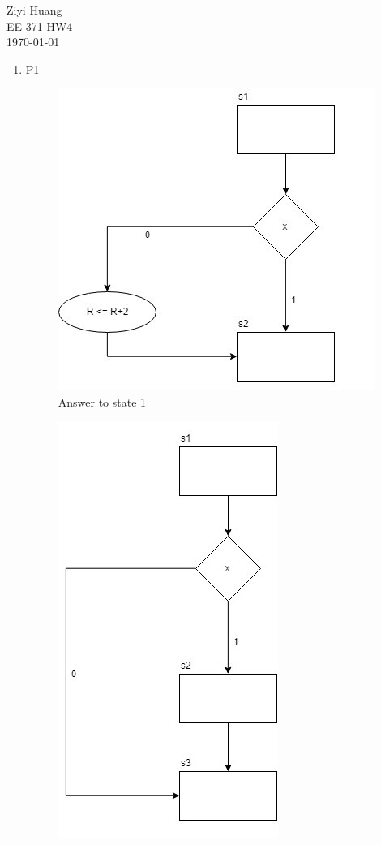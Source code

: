 \documentclass{article}
\begin{document}
	\noindent Ziyi Huang \\
	EE 371 HW4\\
	\today
	\begin{enumerate}
		\item P1\\
			\begin{figure}[H]
				\centering
				\includegraphics[scale=0.7]{ASMD1.jpg}
				\caption{Answer to state 1}
			\end{figure}
			\begin{figure}[H]
				\centering
				\includegraphics[scale=0.7]{ASMD2.jpg}

\end{figure}
\end{enumerate}
\end{document}
